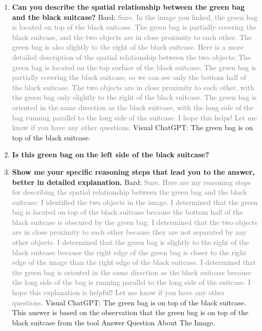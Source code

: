     \begin{enumerate}
        \item \textbf{Can you describe the spatial relationship between the green bag and the black suitcase?}
        \subitem Bard: \textcolor{gray}{ Sure. In the image you linked, the green bag is located on top of the black suitcase. The green bag is partially covering the black suitcase, and the two objects are in close proximity to each other. The green bag is also slightly to the right of the black suitcase.
        Here is a more detailed description of the spatial relationship between the two objects:
        The green bag is located on the top surface of the black suitcase.
        The green bag is partially covering the black suitcase, so we can see only the bottom half of the black suitcase.
        The two objects are in close proximity to each other, with the green bag only slightly to the right of the black suitcase.
        The green bag is oriented in the same direction as the black suitcase, with the long side of the bag running parallel to the long side of the suitcase.
        I hope this helps! Let me know if you have any other questions. }
        \subitem Visual ChatGPT: The green bag is on top of the black suitcase.
        \item \textbf{Is this green bag on the left side of the black suitcase?}
        \item \textbf{Show me your specific reasoning steps that lead you to the answer, better in detailed explanation.}
        \subitem Bard: \textcolor{gray}{ 
        Sure. Here are my reasoning steps for describing the spatial relationship between the green bag and the black suitcase:
        I identified the two objects in the image.
        I determined that the green bag is located on top of the black suitcase because the bottom half of the black suitcase is obscured by the green bag.
        I determined that the two objects are in close proximity to each other because they are not separated by any other objects.
        I determined that the green bag is slightly to the right of the black suitcase because the right edge of the green bag is closer to the right edge of the image than the right edge of the black suitcase.
        I determined that the green bag is oriented in the same direction as the black suitcase because the long side of the bag is running parallel to the long side of the suitcase.
        I hope this explanation is helpful! Let me know if you have any other questions. }
        \subitem Visual ChatGPT: The green bag is on top of the black suitcase. This answer is based on the observation that the green bag is on top of the black suitcase from the tool Answer Question About The Image.
    \end{enumerate}
